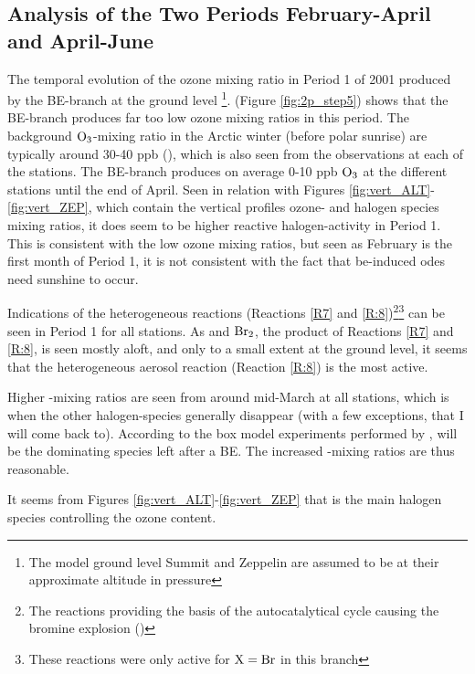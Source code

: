 \subsection{Analysis of the Two Periods February-April and April-June}\label{sec:disc_twoPeriods}

The temporal evolution of the ozone mixing ratio in Period 1 of 2001 produced by the BE-branch at the ground level \footnote{The model ground level Summit and Zeppelin are assumed to be at their approximate altitude in pressure}. (Figure \ref{fig:2p_step5}) shows that the BE-branch produces far too low ozone mixing ratios in this period. The background $\mathrm{O_3}$-mixing ratio in the Arctic winter (before polar sunrise) are typically around 30-40 ppb (\cite{Foster2001}), which is also seen from the observations at each of the stations. The BE-branch produces on average 0-10 ppb $\mathrm{O_3}$ at the different stations until the end of April. Seen in relation with Figures \ref{fig:vert_ALT}-\ref{fig:vert_ZEP}, which contain the vertical profiles ozone- and halogen species mixing ratios, it does seem to be higher reactive halogen-activity in Period 1. This is consistent with the low ozone mixing ratios, but seen as February is the first month of Period 1, it is not consistent with the fact that \acrshort{be}-induced \acrshort{ode}s need sunshine to occur. 

\medskip

Indications of the heterogeneous reactions (Reactions \ref{R7} and \ref{R:8})\footnote{The reactions providing the basis of the autocatalytical cycle causing the bromine explosion (\cite{Simpson2015})}\footnote{These reactions were only active for $\mathrm{X} = \mathrm{Br}$ in this branch} can be seen in Period 1 for all stations. As  and $\mathrm{Br_2}$, the product of Reactions \ref{R7} and \ref{R:8}, is seen mostly aloft, and only to a small extent at the ground level, it seems that the heterogeneous aerosol reaction (Reaction \ref{R:8}) is the most active. 

Higher -mixing ratios are seen from around mid-March at all stations, which is when the other halogen-species generally disappear (with a few exceptions, that I will come back to). According to the box model experiments performed by \cite{CAO},  will be the dominating species left after a BE. The increased -mixing ratios are thus reasonable.  

It seems from Figures \ref{fig:vert_ALT}-\ref{fig:vert_ZEP} that  is the main halogen species controlling the ozone content. 

